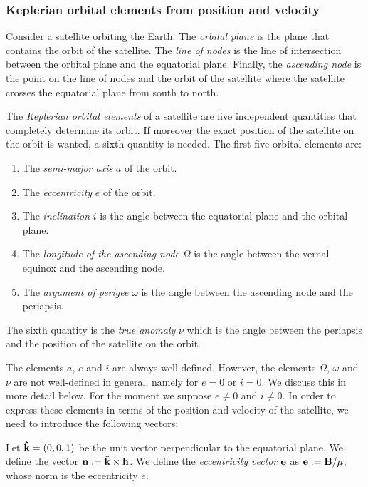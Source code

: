\documentclass[../main.tex]{subfiles}
\begin{document}
\subsubsection{Keplerian orbital elements from position and velocity}
\begin{definition}
  Consider a satellite orbiting the Earth. The \emph{orbital plane} is the plane that contains the orbit of the satellite. The \emph{line of nodes} is the line of intersection between the orbital plane and the equatorial plane. Finally, the \emph{ascending node} is the point on the line of nodes and the orbit of the satellite where the satellite crosses the equatorial plane from south to north.
\end{definition}
\begin{definition}
  The \emph{Keplerian orbital elements} of a satellite are five independent quantities that completely determine its orbit. If moreover the exact position of the satellite on the orbit is wanted, a sixth quantity is needed. The first five orbital elements are:
  \begin{enumerate}
    \item The \emph{semi-major axis} $a$ of the orbit.
    \item The \emph{eccentricity} $e$ of the orbit.
    \item The \emph{inclination} $i$ is the angle between the equatorial plane and the orbital plane.
    \item The \emph{longitude of the ascending node} $\Omega$ is the angle between the vernal equinox and the ascending node.
    \item The \emph{argument of perigee} $\omega$ is the angle between the ascending node and the periapsis.
  \end{enumerate}
  The sixth quantity is the \emph{true anomaly} $\nu$ which is the angle between the periapsis and the position of the satellite on the orbit.
\end{definition}
The elements $a$, $e$ and $i$ are always well-defined. However, the elements $\Omega$, $\omega$ and $\nu$ are not well-defined in general, namely for $e=0$ or $i=0$. We discuss this in more detail below. For the moment we suppose $e\neq 0$ and $i\neq 0$. In order to express these elements in terms of the position and velocity of the satellite, we need to introduce the following vectors:
\begin{definition}
  Let $\boldsymbol{\mathrm{\hat{k}}}=(0,0,1)$ be the unit vector perpendicular to the equatorial plane. We define the vector $\boldsymbol{\mathrm{n}}:=\boldsymbol{\mathrm{\hat{k}}}\times \boldsymbol{\mathrm{h}}$. We define the \emph{eccentricity vector} $\boldsymbol{\mathrm{e}}$ as $\boldsymbol{\mathrm{e}}:=\boldsymbol{\mathrm{B}}/\mu$, whose norm is the eccentricity $e$.
\end{definition}
\end{document}
